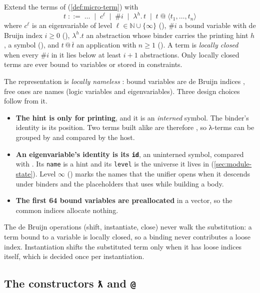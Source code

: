 \begin{definition}\label{def:module-terms}
Extend the terms of \micro{} (\cref{def:micro-term}) with
\[
  t \;::=\; \dots \;\mid\; c^{\ell} \;\mid\; \#i \;\mid\; \lambda^{h}.\,t \;\mid\; t\;@\;\langle t_1,\dots,t_n\rangle
\]
where $c^\ell$ is an eigenvariable of level $\ell\in\mathbb N\cup\{\infty\}$ (), $\#i$ a
bound variable with de Bruijn index $i\ge 0$ (), $\lambda^h.t$ an abstraction whose binder
carries the printing hint $h$, a symbol (), and $t\,@\,\bar t$ an application with $n\ge 1$
(). A term is \emph{locally closed} when every $\#i$ in it lies below at least $i+1$
abstractions. Only locally closed terms are ever bound to variables or stored in constraints.
\end{definition}

The representation is \emph{locally nameless} \cite{Chargueraud2012}: bound variables are de Bruijn indices
\cite{deBruijn1972}, free ones are names (logic variables and eigenvariables). Three design choices follow
from it.
\begin{itemize}
  \item \textbf{The hint is only for printing}, and it is an \emph{interned} symbol. The binder's identity is
    its position. Two terms built alike are therefore , so λ-terms can be grouped by
     and compared by the host.
  \item \textbf{An eigenvariable's identity is its \texttt{id}}, an uninterned symbol, compared with .
    Its \texttt{name} is a hint and its \texttt{level} is the universe it lives in (\cref{sec:module-state}).
    Level $\infty$ () marks the names that the unifier opens when it descends under binders and
    the placeholders that  uses while building a body.
  \item \textbf{The first 64 bound variables are preallocated} in a vector, so the common indices allocate
    nothing.
\end{itemize}
The de Bruijn operations (shift, instantiate, close) never walk the substitution: a term bound to a variable
is locally closed, so a binding never contributes a loose index. Instantiation shifts the substituted term
only when it has loose indices itself, which is decided once per instantiation.

\subsection{The constructors \texorpdfstring{\texttt{ƛ}}{ƛ} and \texorpdfstring{\texttt{@}}{@}}

